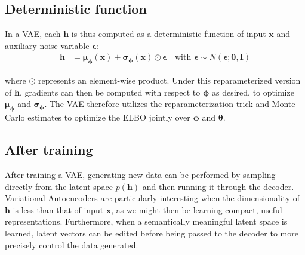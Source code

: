 \documentclass[%
oneside,                 %
final,                   %
10pt]{article}
\begin{document}
\subsection{Deterministic function}

In a VAE, each $\bm{h}$ is thus computed as a deterministic function of input $\bm{x}$ and auxiliary noise variable $\bm{\epsilon}$:
\begin{align*}
    \bm{h} &= \bm{\mu}_{\bm{\phi}}(\bm{x}) + \bm{\sigma}_{\bm{\phi}}(\bm{x})\odot\bm{\epsilon} \quad \text{with } \bm{\epsilon} \sim N(\bm{\epsilon};\bm{0}, \textbf{I})
\end{align*}

where $\odot$ represents an element-wise product.  Under this
reparameterized version of $\bm{h}$, gradients can then be computed
with respect to $\bm{\phi}$ as desired, to optimize
$\bm{\mu}_{\bm{\phi}}$ and $\bm{\sigma}_{\bm{\phi}}$.  The VAE
therefore utilizes the reparameterization trick and Monte Carlo
estimates to optimize the ELBO jointly over $\bm{\phi}$ and
$\bm{\theta}$.

\subsection{After training}

After training a VAE, generating new data can be performed by sampling
directly from the latent space $p(\bm{h})$ and then running it through
the decoder.  Variational Autoencoders are particularly interesting
when the dimensionality of $\bm{h}$ is less than that of input
$\bm{x}$, as we might then be learning compact, useful
representations.  Furthermore, when a semantically meaningful latent
space is learned, latent vectors can be edited before being passed to
the decoder to more precisely control the data generated.



\end{document}
